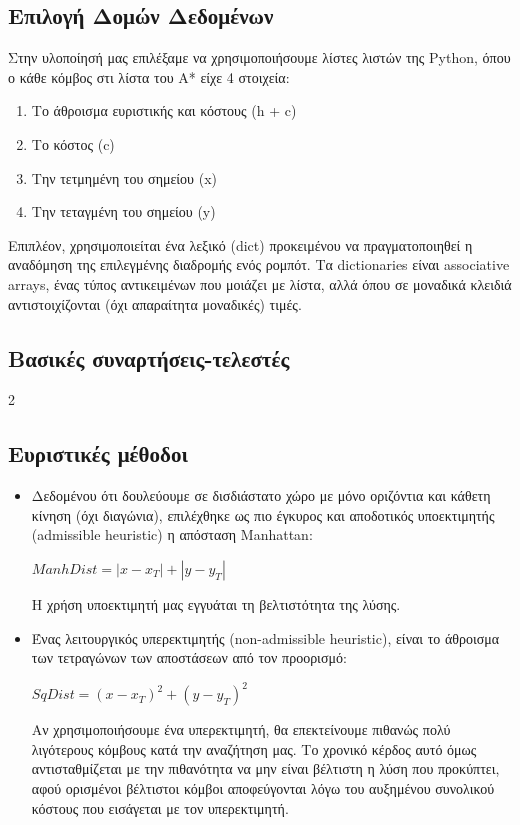 \documentclass[a4paper,9pt]{article}
\begin{document}



\subsection{Επιλογή Δομών Δεδομένων}
Στην υλοποίησή μας επιλέξαμε να χρησιμοποιήσουμε λίστες λιστών της Python,
όπου ο κάθε κόμβος στι λίστα του A* είχε 4 στοιχεία:
\begin{enumerate}
    \item Το άθροισμα ευριστικής και κόστους (h + c)
    \item Το κόστος (c)
    \item Την τετμημένη του σημείου (x)
    \item Την τεταγμένη του σημείου (y)
\end{enumerate}

Επιπλέον, χρησιμοποιείται ένα λεξικό (dict) προκειμένου να
πραγματοποιηθεί η αναδόμηση της επιλεγμένης διαδρομής ενός ρομπότ. Τα
dictionaries είναι associative arrays, ένας τύπος αντικειμένων που μοιάζει με
λίστα, αλλά όπου σε μοναδικά κλειδιά αντιστοιχίζονται (όχι απαραίτητα
μοναδικές) τιμές.



\subsection{Βασικές συναρτήσεις-τελεστές}
2


\subsection{Ευριστικές μέθοδοι}
\begin{itemize}
\item
Δεδομένου ότι δουλεύουμε σε δισδιάστατο χώρο με μόνο οριζόντια και κάθετη
κίνηση (όχι διαγώνια), επιλέχθηκε ως πιο έγκυρος και αποδοτικός υποεκτιμητής
(admissible heuristic) η απόσταση Manhattan:
\begin{center} $ManhDist = |x - x_T| + |y - y_T|$ \end{center}
Η χρήση υποεκτιμητή μας εγγυάται τη βελτιστότητα της λύσης.

\item
Ένας
λειτουργικός υπερεκτιμητής (non-admissible heuristic), είναι το άθροισμα των
τετραγώνων των αποστάσεων από τον προορισμό:
\begin{center} $SqDist = (x - x_T)^2 + (y - y_T)^2$ \end{center}
Αν χρησιμοποιήσουμε ένα υπερεκτιμητή, θα επεκτείνουμε πιθανώς πολύ λιγότερους
κόμβους κατά την αναζήτηση μας. Το χρονικό κέρδος αυτό όμως αντισταθμίζεται με
την πιθανότητα να μην είναι βέλτιστη η λύση που προκύπτει, αφού ορισμένοι
βέλτιστοι κόμβοι αποφεύγονται λόγω του αυξημένου συνολικού κόστους που
εισάγεται με τον υπερεκτιμητή.
\end{itemize}
\end{document}
